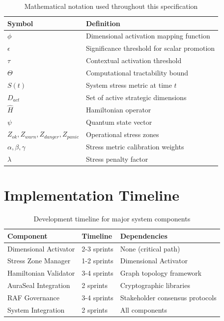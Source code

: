 \documentclass[12pt]{article}
\begin{document}
\begin{table}[h]
\centering
\begin{tabular}{|l|l|}
\hline
\textbf{Symbol} & \textbf{Definition} \\
\hline
$\phi$ & Dimensional activation mapping function \\
$\epsilon$ & Significance threshold for scalar promotion \\
$\tau$ & Contextual activation threshold \\
$\Theta$ & Computational tractability bound \\
$S(t)$ & System stress metric at time $t$ \\
$D_{act}$ & Set of active strategic dimensions \\
$\hat{H}$ & Hamiltonian operator \\
$\psi$ & Quantum state vector \\
$Z_{ok}, Z_{warn}, Z_{danger}, Z_{panic}$ & Operational stress zones \\
$\alpha, \beta, \gamma$ & Stress metric calibration weights \\
$\lambda$ & Stress penalty factor \\
\hline
\end{tabular}
\caption{Mathematical notation used throughout this specification}
\end{table}

\section{Implementation Timeline}

\begin{table}[h]
\centering
\begin{tabular}{|l|l|l|}
\hline
\textbf{Component} & \textbf{Timeline} & \textbf{Dependencies} \\
\hline
Dimensional Activator & 2-3 sprints & None (critical path) \\
Stress Zone Manager & 1-2 sprints & Dimensional Activator \\
Hamiltonian Validator & 3-4 sprints & Graph topology framework \\
AuraSeal Integration & 2 sprints & Cryptographic libraries \\
RAF Governance & 3-4 sprints & Stakeholder consensus protocols \\
System Integration & 2 sprints & All components \\
\hline
\end{tabular}
\caption{Development timeline for major system components}
\end{table}
\end{document}
